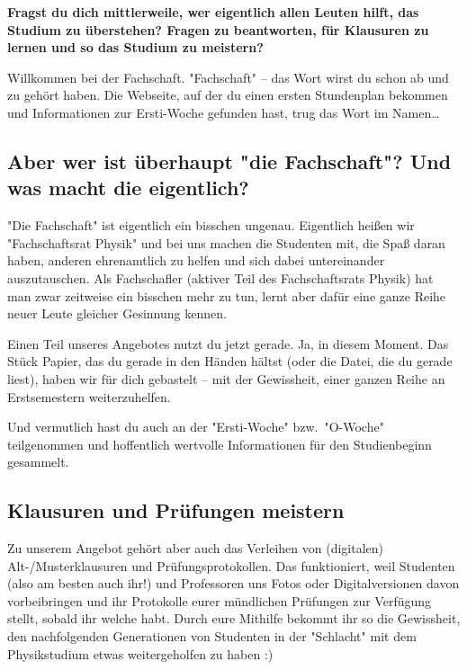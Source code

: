 \begin{multicols}{2}
\fibelspacingsubsubsection[subsection]

\textbf{Fragst du dich mittlerweile, wer eigentlich allen Leuten hilft, das Studium zu überstehen? Fragen zu beantworten, für Klausuren zu lernen und so das Studium zu meistern?}

Willkommen bei der Fachschaft.
"Fachschaft" -- das Wort wirst du schon ab und zu gehört haben.
Die Webseite, auf der du einen ersten Stundenplan bekommen und Informationen zur Ersti-Woche gefunden hast, trug das Wort im Namen\dots

\subsection*{Aber wer ist überhaupt "die Fachschaft"? Und was macht die eigentlich?}
"Die Fachschaft" ist eigentlich ein bisschen ungenau.
Eigentlich heißen wir "Fachschaftsrat Physik" und bei uns machen die Studenten mit, die Spaß daran haben, anderen ehrenamtlich zu helfen und sich dabei untereinander auszutauschen.
Als Fachschafler (aktiver Teil des Fachschaftsrats Physik) hat man zwar zeitweise ein bisschen mehr zu tun, lernt aber dafür eine ganze Reihe neuer Leute gleicher Gesinnung kennen.

Einen Teil unseres Angebotes nutzt du jetzt gerade.
Ja, in diesem Moment.
Das Stück Papier, das du gerade in den Händen hältst (oder die Datei, die du gerade liest), haben wir für dich gebastelt -- mit der Gewissheit, einer ganzen Reihe an Erstsemestern weiterzuhelfen.

Und vermutlich hast du auch an der "Ersti-Woche" bzw.\ "O-Woche" teilgenommen und hoffentlich wertvolle Informationen für den Studienbeginn gesammelt.

\subsection*{Klausuren und Prüfungen meistern}
Zu unserem Angebot gehört aber auch das Verleihen von (digitalen) Alt-/Musterklausuren und Prüfungsprotokollen.
Das funktioniert, weil Studenten (also am besten auch ihr!) und Professoren uns Fotos oder Digitalversionen davon vorbeibringen und ihr Protokolle eurer mündlichen Prüfungen zur Verfügung stellt, sobald ihr welche habt.
Durch eure Mithilfe bekommt ihr so die Gewissheit, den nachfolgenden Generationen von Studenten in der "Schlacht" mit dem Physikstudium etwas weitergeholfen zu haben :)


\end{multicols}
